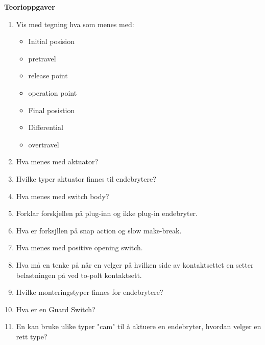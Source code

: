 \vskip 5pt 
\vskip 5pt 
\textbf{Teorioppgaver}
\begin{enumerate}
	\item Vis med tegning hva som menes med:
		\begin{itemize}[noitemsep]
			\item Initial posision
			\item pretravel
			\item release point
			\item operation point
			\item Final posistion
			\item Differential
			\item overtravel
		\end{itemize}

	
	\item Hva menes med aktuator?
	\item Hvilke typer aktuator finnes til endebrytere?
	\item Hva menes med switch body?
	\item Forklar forskjellen på plug-inn og ikke plug-in endebryter. 
	\item Hva er forksjllen  på snap action og slow make-break.
	\item Hva menes med positive opening switch.
	\item Hva må en tenke på når en velger på hvilken side av kontaktsettet en setter belastningen på ved to-polt kontaktsett.
	\item Hvilke monteringstyper finnes for endebrytere?
	\item Hva er en Guard Switch?
	\item En kan bruke ulike typer "cam" til å aktuere en endebryter, hvordan velger en rett type?
\end{enumerate}













